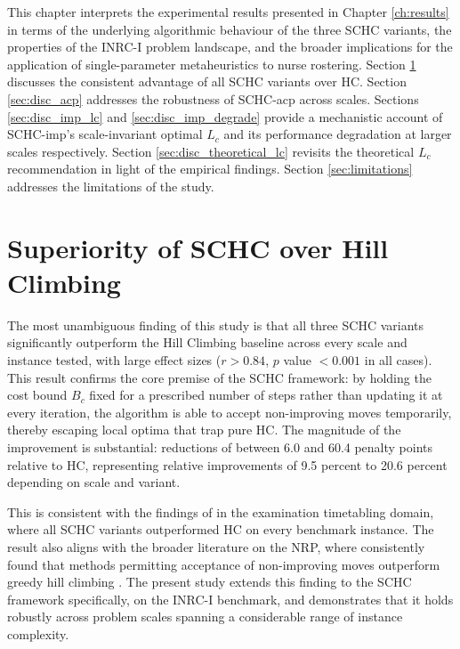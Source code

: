 \documentclass[12pt, a4paper, oneside]{report}
\begin{document}
This chapter interprets the experimental results presented in Chapter
\ref{ch:results} in terms of the underlying algorithmic behaviour of
the three SCHC variants, the properties of the INRC-I problem
landscape, and the broader implications for the application of
single-parameter metaheuristics to nurse rostering. Section
\ref{sec:disc_hc} discusses the consistent advantage of all SCHC
variants over HC. Section \ref{sec:disc_acp} addresses the
robustness of SCHC-acp across scales. Sections \ref{sec:disc_imp_lc}
and \ref{sec:disc_imp_degrade} provide a mechanistic account of
SCHC-imp's scale-invariant optimal $L_c$ and its performance
degradation at larger scales respectively. Section
\ref{sec:disc_theoretical_lc} revisits the theoretical $L_c$
recommendation in light of the empirical findings. Section
\ref{sec:limitations} addresses the limitations of the study.

\section{Superiority of SCHC over Hill Climbing}
\label{sec:disc_hc}

The most unambiguous finding of this study is that all three SCHC
variants significantly outperform the Hill Climbing baseline across
every scale and instance tested, with large effect sizes ($r > 0.84$,
$p$ value $< 0.001$ in all cases). This result confirms the core premise of
the SCHC framework: by holding the cost bound $B_c$ fixed for a
prescribed number of steps rather than updating it at every
iteration, the algorithm is able to accept non-improving moves
temporarily, thereby escaping local optima that trap pure HC. The
magnitude of the improvement is substantial: reductions of between
6.0 and 60.4 penalty points relative to HC, representing relative
improvements of 9.5 percent to 20.6 percent depending on scale and
variant.

This is consistent with the findings of \citet{Bykov2016} in the
examination timetabling domain, where all SCHC variants outperformed
HC on every benchmark instance. The result also aligns with the
broader literature on the NRP, where \citet{Awadallah2015, Hadwan2019} consistently found that
methods permitting acceptance of non-improving moves outperform
greedy hill climbing . The present
study extends this finding to the SCHC framework specifically, on the
INRC-I benchmark, and demonstrates that it holds robustly across
problem scales spanning a considerable range of instance complexity.
\end{document}
